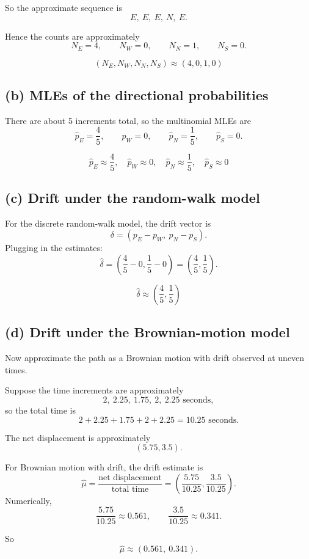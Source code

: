 \documentclass[11pt]{article}
\begin{document}
So the approximate sequence is
\[
E,\ E,\ E,\ N,\ E.
\]

Hence the counts are approximately
\[
N_E=4,\qquad N_W=0,\qquad N_N=1,\qquad N_S=0.
\]

\[
\boxed{
(N_E,N_W,N_N,N_S)\approx (4,0,1,0)
}
\]

\subsection*{(b) MLEs of the directional probabilities}

There are about 5 increments total, so the multinomial MLEs are
\[
\hat p_E=\frac45,\qquad
\hat p_W=0,\qquad
\hat p_N=\frac15,\qquad
\hat p_S=0.
\]

\[
\boxed{
\hat p_E\approx \frac45,\quad
\hat p_W\approx 0,\quad
\hat p_N\approx \frac15,\quad
\hat p_S\approx 0
}
\]

\subsection*{(c) Drift under the random-walk model}

For the discrete random-walk model, the drift vector is
\[
\delta=(p_E-p_W,\ p_N-p_S).
\]
Plugging in the estimates:
\[
\hat\delta
=
\left(\frac45-0,\frac15-0\right)
=
\left(\frac45,\frac15\right).
\]

\[
\boxed{
\hat\delta\approx \left(\frac45,\frac15\right)
}
\]

\subsection*{(d) Drift under the Brownian-motion model}

Now approximate the path as a Brownian motion with drift observed at uneven times.

Suppose the time increments are approximately
\[
2,\ 2.25,\ 1.75,\ 2,\ 2.25 \text{ seconds},
\]
so the total time is
\[
2+2.25+1.75+2+2.25=10.25 \text{ seconds}.
\]

The net displacement is approximately
\[
(5.75,3.5).
\]

For Brownian motion with drift, the drift estimate is
\[
\hat\mu
=
\frac{\text{net displacement}}{\text{total time}}
=
\left(\frac{5.75}{10.25},\frac{3.5}{10.25}\right).
\]
Numerically,
\[
\frac{5.75}{10.25}\approx 0.561,
\qquad
\frac{3.5}{10.25}\approx 0.341.
\]

So
\[
\boxed{
\hat\mu\approx (0.561,\ 0.341).
}
\]
\end{document}
